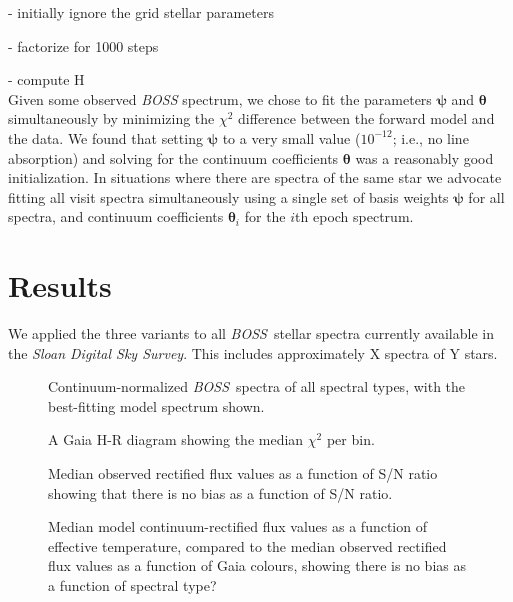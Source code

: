 \documentclass[modern]{aastex631}
\newcommand{\project}[1]{\textit{#1}}
\newcommand{\vectheta}{\boldsymbol{\theta}}
\newcommand{\vecpsi}{\boldsymbol{\psi}}
\newcommand{\boss}{\project{BOSS}}
\newcommand{\todo}[1]{\textcolor{tab:blue}{#1}}
\begin{document}
- initially ignore the grid stellar parameters 

- factorize for 1000 steps

- compute H\\

Given some observed \emph{BOSS} spectrum, we chose to fit the parameters $\vecpsi$ and $\vectheta$ simultaneously by minimizing the $\chi^2$ difference between the forward model and the data. We found that setting $\vecpsi$ to a very small value ($10^{-12}$; i.e., no line absorption) and solving for the continuum coefficients $\vectheta$ was a reasonably good initialization. In situations where there are spectra of the same star we advocate fitting all visit spectra simultaneously using a single set of basis weights $\vecpsi$ for all spectra, and continuum coefficients $\vectheta_i$ for the $i$th epoch spectrum. 



\section{Results}
\label{sec:results}

We applied the three variants to all \boss\ stellar spectra currently available in the \emph{Sloan Digital Sky Survey}. This includes approximately \todo{X} spectra of \todo{Y} stars. 


\begin{figure}
    \caption{Continuum-normalized \boss\ spectra of all spectral types, with the best-fitting model spectrum shown.}
\end{figure}



\begin{figure}
    \caption{A Gaia H-R diagram showing the median $\chi^2$ per bin.}
\end{figure}


\begin{figure}
    \caption{Median observed rectified flux values as a function of S/N ratio showing that there is no bias as a function of S/N ratio.}
\end{figure}


\begin{figure}
    \caption{Median model continuum-rectified flux values as a function of effective temperature, compared to the median observed rectified flux values as a function of Gaia colours, showing there is no bias as a function of spectral type?}
\end{figure}
\end{document}

